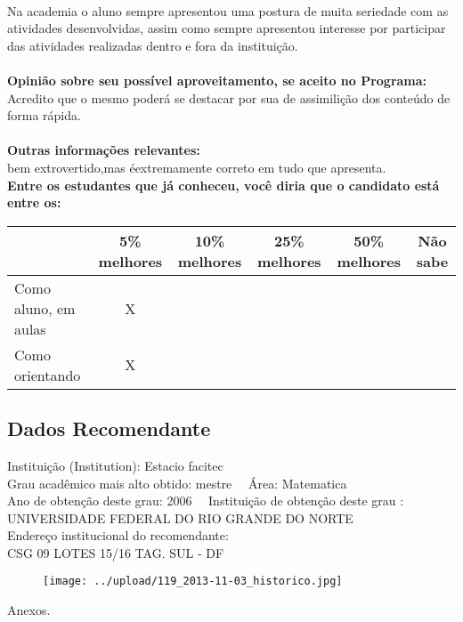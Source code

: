 \documentclass[11pt]{article}
\begin{document}
\\Na academia o aluno sempre apresentou uma postura de muita seriedade com as atividades desenvolvidas, assim como sempre apresentou interesse por participar das atividades realizadas dentro e fora da instituição.
\\
\\
\textbf{Opinião sobre seu possível aproveitamento, se aceito no Programa:}
\\Acredito que o mesmo poderá se destacar por sua de assimilição dos conteúdo de forma rápida.\\ 
\\
\textbf{Outras informações relevantes:} \\ bem extrovertido,mas éextremamente correto em tudo que apresenta.
\\[0.3cm]
\textbf{Entre os estudantes que já conheceu, você diria que o candidato está entre os:}
\\
\begin{tabular}{|l|c|c|c|c|c|}
\hline
 & 5\% melhores & 10\% melhores & 25\% melhores & 50\% melhores & Não sabe \\
\hline
Como aluno, em aulas & X &  &  &  & \\
\hline
Como orientando & X &  &  &  & \\
\hline
\end{tabular}
\subsection*{Dados Recomendante} 
	Instituição (Institution): Estacio facitec
\\ 
	Grau acadêmico mais alto obtido: mestre
	\ \ Área: Matematica
	\\
	Ano de obtenção deste grau: 2006
	\ \ 
	Instituição de obtenção deste grau : UNIVERSIDADE FEDERAL DO RIO GRANDE DO NORTE
	\\ 
	Endereço institucional do recomendante: \\ CSG 09 LOTES 15/16 TAG. SUL - DF	
\begin{figure}[!htb]
\texttt{[image: ../upload/119\_2013-11-03\_historico.jpg]}
\end{figure} 
\begin{center}
Anexos.
\end{center}
\end{document}

